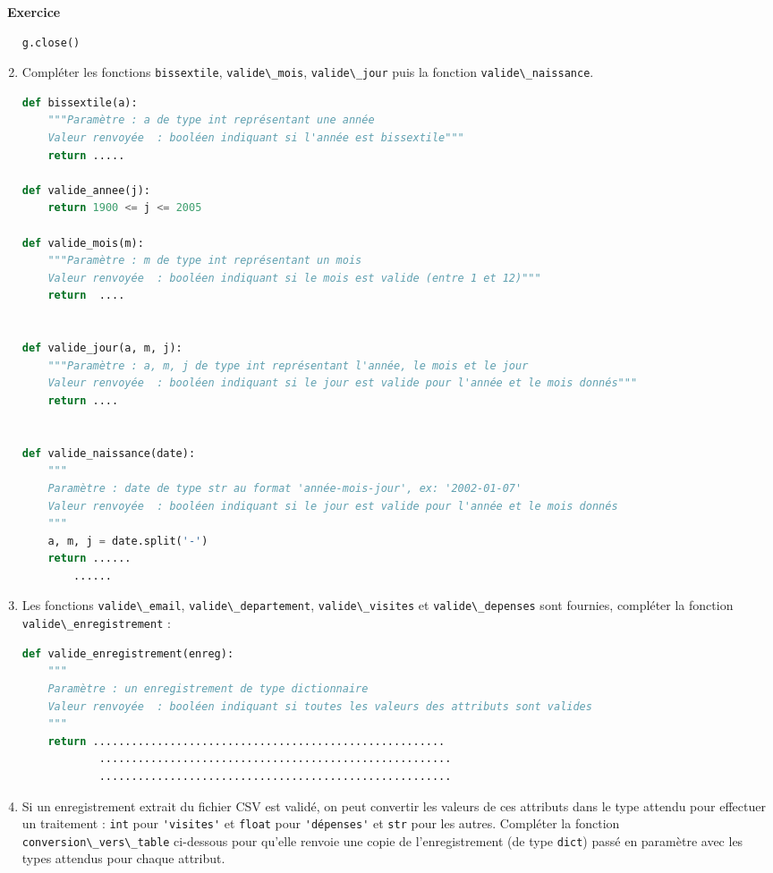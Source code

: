 \documentclass[
  11pt,
]{article}
\newcommand{\passthrough}[1]{#1}
\newcounter{exo}
\newenvironment{exercice}[1]
{\par \medskip   \addtocounter{exo}{1} \noindent  
\begin{bclogo}[arrondi =0.1,   noborder = true, logo=\bccrayon, marge=4]{~\textbf{Exercice} \textbf{\theexo} {\itshape #1} }  \par}
{
\end{bclogo}
 \par \bigskip }
\newcounter{def}
\begin{document}
\begin{exercice}{}
\begin{enumerate}
\begin{lstlisting}[language=Python]
    g.close()
\end{lstlisting}
\item
  Compléter les fonctions \passthrough{\lstinline!bissextile!},
  \passthrough{\lstinline!valide\_mois!},
  \passthrough{\lstinline!valide\_jour!} puis la fonction
  \passthrough{\lstinline!valide\_naissance!}.

\begin{lstlisting}[language=Python]
def bissextile(a):
    """Paramètre : a de type int représentant une année
    Valeur renvoyée  : booléen indiquant si l'année est bissextile"""
    return .....

def valide_annee(j):
    return 1900 <= j <= 2005

def valide_mois(m):
    """Paramètre : m de type int représentant un mois
    Valeur renvoyée  : booléen indiquant si le mois est valide (entre 1 et 12)"""
    return  ....


def valide_jour(a, m, j):
    """Paramètre : a, m, j de type int représentant l'année, le mois et le jour
    Valeur renvoyée  : booléen indiquant si le jour est valide pour l'année et le mois donnés"""
    return ....


def valide_naissance(date):
    """
    Paramètre : date de type str au format 'année-mois-jour', ex: '2002-01-07'
    Valeur renvoyée  : booléen indiquant si le jour est valide pour l'année et le mois donnés
    """
    a, m, j = date.split('-')
    return ......
        ......
\end{lstlisting}
\item
  Les fonctions \passthrough{\lstinline!valide\_email!},
  \passthrough{\lstinline!valide\_departement!},
  \passthrough{\lstinline!valide\_visites!} et
  \passthrough{\lstinline!valide\_depenses!} sont fournies, compléter la
  fonction \passthrough{\lstinline!valide\_enregistrement!} :

\begin{lstlisting}[language=Python]
def valide_enregistrement(enreg):
    """
    Paramètre : un enregistrement de type dictionnaire
    Valeur renvoyée  : booléen indiquant si toutes les valeurs des attributs sont valides
    """
    return .......................................................
            .......................................................
            .......................................................
\end{lstlisting}
\item
  Si un enregistrement extrait du fichier CSV est validé, on peut
  convertir les valeurs de ces attributs dans le type attendu pour
  effectuer un traitement : \passthrough{\lstinline!int!} pour
  \passthrough{\lstinline!'visites'!} et \passthrough{\lstinline!float!}
  pour \passthrough{\lstinline!'dépenses'!} et
  \passthrough{\lstinline!str!} pour les autres. Compléter la fonction
  \passthrough{\lstinline!conversion\_vers\_table!} ci-dessous pour
  qu'elle renvoie une copie de l'enregistrement (de type
  \passthrough{\lstinline!dict!}) passé en paramètre avec les types
  attendus pour chaque attribut.


\end{enumerate}
\end{exercice}
\end{document}
